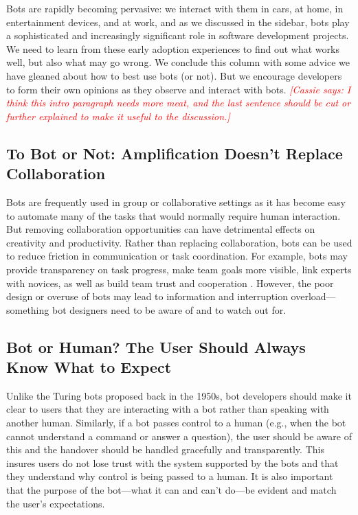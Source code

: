 \documentclass{sig-alternate}
\newcommand{\cp}[1]{\textcolor{red}{{\it [Cassie says: #1]}}}
\newcommand{\cp}[1]{}
\begin{document}
	Bots are rapidly becoming pervasive: we interact with them in cars, at home, in entertainment devices, and at work, and as we discussed in the sidebar, bots play a sophisticated and increasingly significant role in software development projects.  
	We need to learn from these early adoption experiences to find out what works well, but also what may go wrong.  We conclude this column with some advice we have gleaned about how to best use bots (or not).   
	But we encourage developers to form their own opinions as they observe and interact with bots. 
	\cp{I think this intro paragraph needs more meat, and the last sentence should be cut or further explained to make it useful to the discussion.} 
	
	
	\subsection{To Bot or Not: Amplification Doesn't Replace Collaboration}
		Bots are frequently used in group or collaborative settings as 
		it has become easy to automate many of the tasks that would normally require human interaction. But removing collaboration opportunities can have detrimental effects on creativity and productivity. 
		Rather than replacing collaboration, bots can be used to reduce friction in communication or task coordination. For example, bots may provide transparency on task progress, make team goals more visible, link experts with novices, as well as build team trust and cooperation \cite{lebeuf2017software}.
		However, the poor design or overuse of bots may lead to information and interruption overload---something bot designers need to be aware of and to watch out for.  

	\subsection{Bot or Human? The User Should Always Know What to Expect}

	Unlike the Turing bots proposed back in the 1950s, bot developers should make it clear to users that they are interacting with a bot rather than speaking with another human. 
	Similarly, if a bot passes control to a human (e.g., when the bot cannot understand a command or answer a question), the user should be aware of this and the handover should be handled gracefully and transparently. This insures users do not lose trust with the system supported by the bots and that they understand why control is being passed to a human. 
	It is also important that the purpose of the bot---what it can and can't do---be evident and match the user's expectations. 
\end{document}
